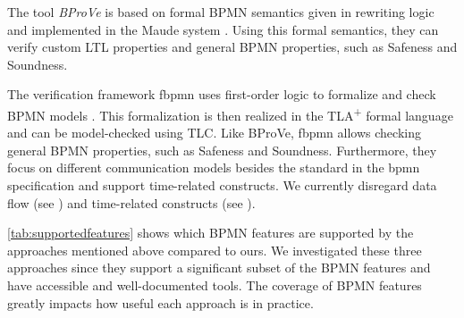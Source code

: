 \documentclass[runningheads]{llncs}
\begin{document}
The tool \textit{BProVe} is based on formal BPMN semantics given in rewriting logic and implemented in the Maude system \cite{corradiniFormalApproachAnalysis2021}.
Using this formal semantics, they can verify custom LTL properties and general BPMN properties, such as Safeness and Soundness.

The verification framework \textsf{fbpmn} uses first-order logic to formalize and check BPMN models \cite{houhouFirstOrderLogicVerification2022}.
This formalization is then realized in the TLA\textsuperscript{+} formal language and can be model-checked using TLC.
Like BProVe, \textsf{fbpmn} allows checking general BPMN properties, such as Safeness and Soundness.
Furthermore, they focus on different communication models besides the standard in the \gls*{bpmn} specification and support time-related constructs.
We currently disregard data flow (see \cite{corradiniFormalisingAnimatingMultiple2022,el-saberCMMICMComplianceChecking2015}) and time-related constructs (see \cite{duranVerifyingTimedBPMN2017,houhouFirstOrderLogicVerification2022}).

\autoref{tab:supportedfeatures} shows which BPMN features are supported by the approaches mentioned above compared to ours.
We investigated these three approaches since they support a significant subset of the BPMN features and have accessible and well-documented tools.
The coverage of BPMN features greatly impacts how useful each approach is in practice.
\end{document}
